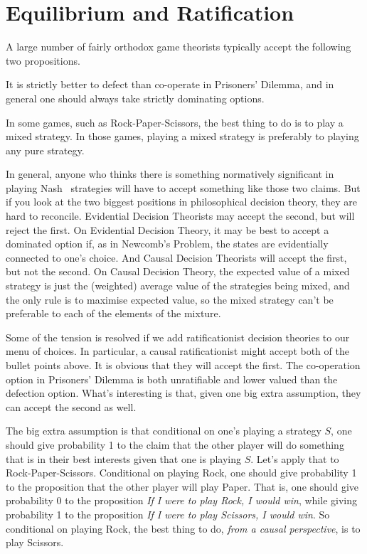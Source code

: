 \section{Equilibrium and Ratification}
A large number of fairly orthodox game theorists typically accept the following two propositions.

\begin{itemize*}
\item It is strictly better to defect than co-operate in Prisoners' Dilemma, and in general one should always take strictly dominating options.
\item In some games, such as Rock-Paper-Scissors, the best thing to do is to play a mixed strategy. In those games, playing a mixed strategy is preferably to playing any pure strategy.
\end{itemize*}

\noindent In general, anyone who thinks there is something normatively significant in playing Nash \Eqm\ strategies will have to accept something like those two claims. But if you look at the two biggest positions in philosophical decision theory, they are hard to reconcile. Evidential Decision Theorists may accept the second, but will reject the first. On Evidential Decision Theory, it may be best to accept a dominated option if, as in Newcomb's Problem, the states are evidentially connected to one's choice. And Causal Decision Theorists will accept the first, but not the second. On Causal Decision Theory, the expected value of a mixed strategy is just the (weighted) average value of the strategies being mixed, and the only rule is to maximise expected value, so the mixed strategy can't be preferable to each of the elements of the mixture.

Some of the tension is resolved if we add ratificationist decision theories to our menu of choices. In particular, a causal ratificationist might accept both of the bullet points above. It is obvious that they will accept the first. The co-operation option in Prisoners' Dilemma is both unratifiable and lower valued than the defection option. What's interesting is that, given one big extra assumption, they can accept the second as well. 

The big extra assumption is that conditional on one's playing a strategy $S$, one should give probability 1 to the claim that the other player will do something that is in their best interests given that one is playing $S$. Let's apply that to Rock-Paper-Scissors. Conditional on playing Rock, one should give probability 1 to the proposition that the other player will play Paper. That is, one should give probability 0 to the proposition \textit{If I were to play Rock, I would win}, while giving probability 1 to the proposition \textit{If I were to play Scissors, I would win}. So conditional on playing Rock, the best thing to do, \textit{from a causal perspective}, is to play Scissors.


